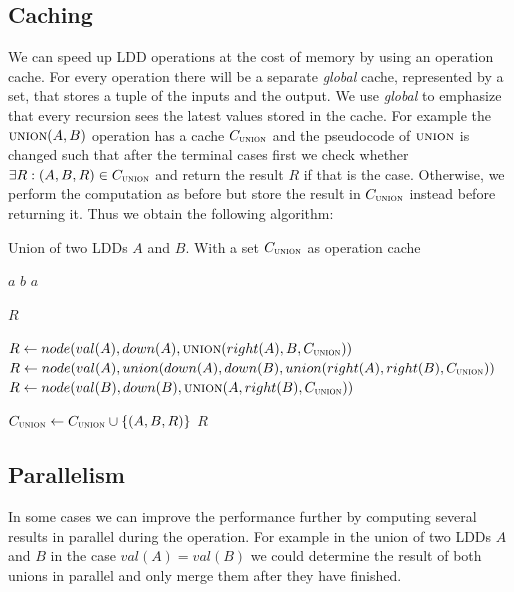 \documentclass[a4paper]{article}
\newcommand{\var}[1]{\textit{#1}}
\begin{document}
\subsection{Caching}

We can speed up LDD operations at the cost of memory by using an operation cache.
For every operation there will be a separate \emph{global} cache, represented by a set, that stores a tuple of the inputs and the output.
We use \emph{global} to emphasize that every recursion sees the latest values stored in the cache.  
For example the $\textsc{union}(A, B)$ operation has a cache $C_\textsc{union}$ and the pseudocode of $\textsc{union}$ is changed such that after the terminal cases first we check whether $\exists R : (A, B, R) \in C_\textsc{union}$ and return the result $R$ if that is the case.
Otherwise, we perform the computation as before but store the result in $C_\textsc{union}$ instead before returning it.
Thus we obtain the following algorithm:

\begin{algorithm}[H]
\caption{Union of two LDDs $\var{A}$ and $\var{B}$.
	With a set $C_\textsc{union}$ as operation cache}
\begin{algorithmic}[1]
	\State \Return $a$
	\State \Return $b$
	\State \Return $a$
\EndIf

	\Return $R$
\EndIf

	\State $R \gets node(val(A), down(A), \textsc{union}(right(A), B, C_\textsc{union}))$
	\State $R \gets node(val(A), union(down(A), down(B), union(right(A), right(B), C_\textsc{union}))$
	\State $R \gets node(val(B), down(B), \textsc{union}(A, right(B), C_\textsc{union}))$
\EndIf

\State $C_\textsc{union} \gets C_\textsc{union} \cup \{(A, B, R)\}$
\State \Return $R$
\EndFunction
\end{algorithmic}
\end{algorithm}

\subsection{Parallelism}

In some cases we can improve the performance further by computing several results in parallel during the operation.
For example in the union of two LDDs $A$ and $B$ in the case $val(A) = val(B)$ we could determine the result of both unions in parallel and only merge them after they have finished.
\end{document}
